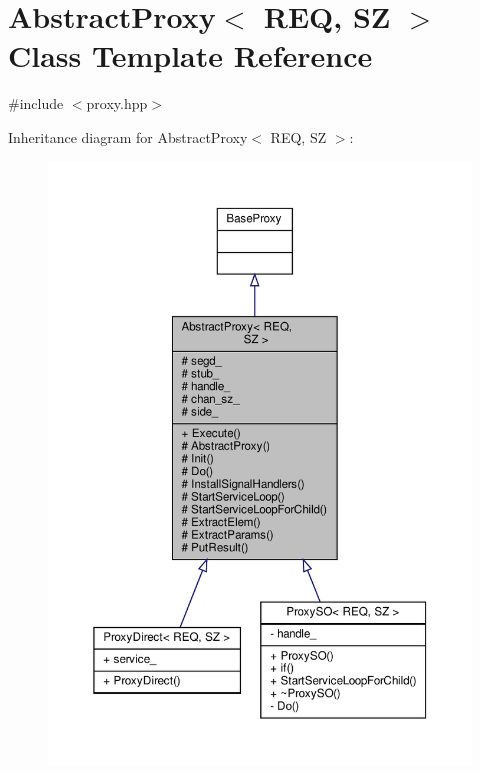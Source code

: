 \hypertarget{classAbstractProxy}{}\section{Abstract\+Proxy$<$ R\+EQ, SZ $>$ Class Template Reference}
\label{classAbstractProxy}


{\ttfamily \#include $<$proxy.\+hpp$>$}



Inheritance diagram for Abstract\+Proxy$<$ R\+EQ, SZ $>$\+:
\nopagebreak
\begin{figure}[H]
\begin{center}
\leavevmode
\includegraphics[width=350pt]{classAbstractProxy__inherit__graph}
\end{center}
\end{figure}


